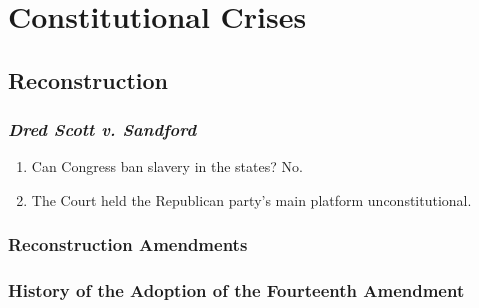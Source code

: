 \section{Constitutional Crises}

\subsection{Reconstruction}

\subsubsection{\emph{Dred Scott v. Sandford}}

\begin{enumerate}
    \item Can Congress ban slavery in the states? No.
    \item The Court held the Republican party's main platform 
    unconstitutional.
\end{enumerate}

\subsubsection{Reconstruction Amendments}

\subsubsection{History of the Adoption of the Fourteenth Amendment}

